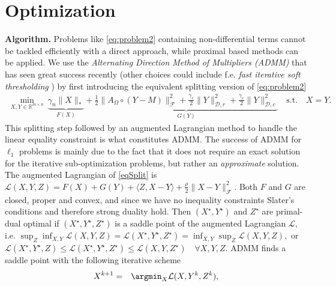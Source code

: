 \documentclass{article}
\begin{document}
\section{Optimization}
\vspace{-0.15cm}
\label{secOpt}
{\bf Algorithm.} Problems like \eqref{eq:problem2} containing non-differential terms cannot be tackled efficiently with a direct approach, while proximal based methods can be applied. We use the \textit{Alternating Direction Method of Multipliers (ADMM)} that has seen great success recently \cite{boyd2011distributed} (other choices could include f.e. \textit{fast iterative soft thresholding} \cite{beck2009fast}) by first introducing the equivalent splitting version of \eqref{eq:problem2}
\vspace{-0.1cm}
\begin{eqnarray}
\min_{X,Y\in\mathbb{R}^{m\times n}}\  \underbrace{ \gamma_n \|X\|_* }_{F(X)} + \underbrace{ \frac{1}{2}\|A_\Omega \circ (Y-M)\|_\mathcal{F}^2 + \frac{\gamma_r}{2} \|Y\|^2_{\mathcal{D},r} + \frac{\gamma_c}{2} \|Y\|^2_{\mathcal{D},c} }_{G(Y)} \quad \textrm{s.t.}\quad X=Y. 
\label{eqSplit}
\end{eqnarray}
This splitting step followed by an augmented Lagrangian method to handle the linear equality constraint is what constitutes ADMM. The success of ADMM for $\ell_1$ problems is mainly due to the fact that it does not require an exact solution for the iterative sub-optimization problems, but rather an {\it approximate} solution. The augmented Lagrangian of \eqref{eqSplit} is $\mathcal{L}(X,Y,Z) = F(X) + G(Y) + \langle Z,X-Y\rangle + \frac{\rho}{2} \|X-Y\|_\mathcal{F}^2$. Both $F$ and $G$ are closed, proper and convex, and since we have no inequality constraints Slater's conditions and therefore strong duality hold. Then $(X^\star,Y^\star)$ and $Z^\star$ are primal-dual optimal if $(X^\star,Y^\star,Z^\star)$ is a saddle point of the augmented Lagrangian $\mathcal{L}$, i.e. $\sup_{Z} \inf_{X,Y} \mathcal{L}(X,Y,Z) = \mathcal{L}(X^\star,Y^\star,Z^\star) = \inf_{X,Y} \sup_{Z}  \mathcal{L}(X,Y,Z),$ or $\mathcal{L}(X^\star,Y^\star,Z) \leq \mathcal{L}(X^\star,Y^\star,Z^\star) \leq \mathcal{L}(X,Y,Z^\star)\quad \forall X,Y,Z$. ADMM finds a saddle point with the following iterative scheme
\vspace{-0.2cm}
\begin{eqnarray}
X^{k+1} &=& \argmin_X \mathcal{L}(X,Y^k,Z^k) \label{eqADMMx}, 
\end{eqnarray}
\end{document}
